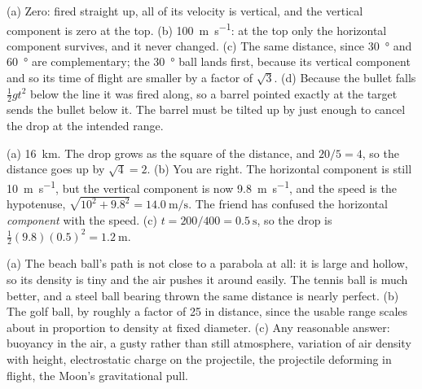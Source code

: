 \documentclass[11pt,twoside,openany]{book}
\begin{document}
\begin{description}[leftmargin=2em,itemsep=2pt]
  \item[3.6] (a) Zero: fired straight up, all of its velocity is vertical, and the vertical component is zero at the top. (b) \SI{100}{\metre\per\second}: at the top only the horizontal component survives, and it never changed. (c) The same distance, since \SI{30}{\degree} and \SI{60}{\degree} are complementary; the \SI{30}{\degree} ball lands first, because its vertical component and so its time of flight are smaller by a factor of $\sqrt3$. (d) Because the bullet falls $\tfrac12 g t^2$ below the line it was fired along, so a barrel pointed exactly at the target sends the bullet below it. The barrel must be tilted up by just enough to cancel the drop at the intended range.
  \item[3.7] (a) \SI{16}{\kilo\metre}. The drop grows as the square of the distance, and $20/5 = 4$, so the distance goes up by $\sqrt4 = 2$. (b) You are right. The horizontal component is still \SI{10}{\metre\per\second}, but the vertical component is now \SI{9.8}{\metre\per\second}, and the speed is the hypotenuse, $\sqrt{10^2+9.8^2} = \SI{14.0}{\metre\per\second}$. The friend has confused the horizontal \emph{component} with the speed. (c) $t = 200/400 = \SI{0.5}{\second}$, so the drop is $\tfrac12(9.8)(0.5)^2 = \SI{1.2}{\metre}$.
  \item[3.8] (a) The beach ball's path is not close to a parabola at all: it is large and hollow, so its density is tiny and the air pushes it around easily. The tennis ball is much better, and a steel ball bearing thrown the same distance is nearly perfect. (b) The golf ball, by roughly a factor of \num{25} in distance, since the usable range scales about in proportion to density at fixed diameter. (c) Any reasonable answer: buoyancy in the air, a gusty rather than still atmosphere, variation of air density with height, electrostatic charge on the projectile, the projectile deforming in flight, the Moon's gravitational pull.
\end{description}
\end{document}
